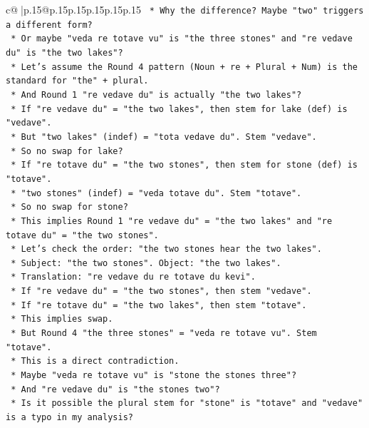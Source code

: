 \documentclass{article}
\begin{document}
{\begin{supertabular}{c@{$\;$}|p{.15\linewidth}@{}p{.15\linewidth}p{.15\linewidth}p{.15\linewidth}p{.15\linewidth}p{.15\linewidth}}
{{{\texttt{        *   Why the difference? Maybe "two" triggers a different form?} \\
\texttt{        *   Or maybe "veda re totave vu" is "the three stones" and "re vedave du" is "the two lakes"?} \\
\texttt{        *   Let's assume the Round 4 pattern (Noun + re + Plural + Num) is the standard for "the" + plural.} \\
\texttt{        *   And Round 1 "re vedave du" is actually "the two lakes"?} \\
\texttt{        *   If "re vedave du" = "the two lakes", then stem for lake (def) is "vedave".} \\
\texttt{        *   But "two lakes" (indef) = "tota vedave du". Stem "vedave".} \\
\texttt{        *   So no swap for lake?} \\
\texttt{        *   If "re totave du" = "the two stones", then stem for stone (def) is "totave".} \\
\texttt{        *   "two stones" (indef) = "veda totave du". Stem "totave".} \\
\texttt{        *   So no swap for stone?} \\
\texttt{        *   This implies Round 1 "re vedave du" = "the two lakes" and "re totave du" = "the two stones".} \\
\texttt{        *   Let's check the order: "the two stones hear the two lakes".} \\
\texttt{        *   Subject: "the two stones". Object: "the two lakes".} \\
\texttt{        *   Translation: "re vedave du re totave du kevi".} \\
\texttt{        *   If "re vedave du" = "the two stones", then stem "vedave".} \\
\texttt{        *   If "re totave du" = "the two lakes", then stem "totave".} \\
\texttt{        *   This implies swap.} \\
\texttt{        *   But Round 4 "the three stones" = "veda re totave vu". Stem "totave".} \\
\texttt{        *   This is a direct contradiction.} \\
\texttt{        *   Maybe "veda re totave vu" is "stone the stones three"?} \\
\texttt{        *   And "re vedave du" is "the stones two"?} \\
\texttt{        *   Is it possible the plural stem for "stone" is "totave" and "vedave" is a typo in my analysis?} \\
}}}
\end{supertabular}}
\end{document}
